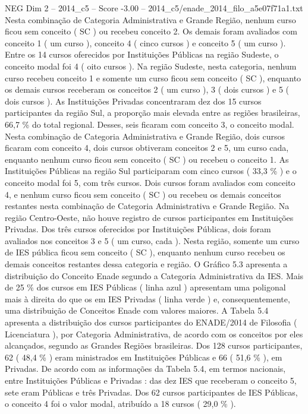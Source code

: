 \begin{textsample}{NEG Dim 2 – 2014\_c5 – Score -3.00 – 2014\_c5/enade\_2014\_filo\_a5e07f71a1.txt}
Nesta combinação de Categoria Administrativa e Grande Região, nenhum curso ficou sem conceito ( SC ) ou recebeu conceito 2.
Os demais foram avaliados com conceito 1 ( um curso ), conceito 4 ( cinco cursos ) e conceito 5 ( um curso ).
Entre os 14 cursos oferecidos por Instituições Públicas na região Sudeste, o conceito modal foi 4 ( oito cursos ).
Na região Sudeste, nesta categoria, nenhum curso recebeu conceito 1 e somente um curso ficou sem conceito ( SC ), enquanto os demais cursos receberam os conceitos 2 ( um curso ), 3 ( dois cursos ) e 5 ( dois cursos ).
As Instituições Privadas concentraram dez dos 15 cursos participantes da região Sul, a proporção mais elevada entre as regiões brasileiras, 66,7 \% do total regional.
Desses, seis ficaram com conceito 3, o conceito modal.
Nesta combinação de Categoria Administrativa e Grande Região, dois cursos ficaram com conceito 4, dois cursos obtiveram conceitos 2 e 5, um curso cada, enquanto nenhum curso ficou sem conceito ( SC ) ou recebeu o conceito 1.
As Instituições Públicas na região Sul participaram com cinco cursos ( 33,3 \% ) e o conceito modal foi 5, com três cursos.
Dois cursos foram avaliados com conceito 4, e nenhum curso ficou sem conceito ( SC ) ou recebeu os demais conceitos restantes nesta combinação de Categoria Administrativa e Grande Região.
Na região Centro-Oeste, não houve registro de cursos participantes em Instituições Privadas.
Dos três cursos oferecidos por Instituições Públicas, dois foram avaliados nos conceitos 3 e 5 ( um curso, cada ).
Nesta região, somente um curso de IES pública ficou sem conceito ( SC ), enquanto nenhum curso recebeu os demais conceitos restantes dessa categoria e região.
O Gráfico 5.3 apresenta a distribuição do Conceito Enade segundo a Categoria Administrativa da IES.
Mais de 25 \% dos cursos em IES Públicas ( linha azul ) apresentam uma poligonal mais à direita do que os em IES Privadas ( linha verde ) e, consequentemente, uma distribuição de Conceitos Enade com valores maiores.
A Tabela 5.4 apresenta a distribuição dos cursos participantes do ENADE/2014 de Filosofia ( Licenciatura ), por Categoria Administrativa, de acordo com os conceitos por eles alcançados, segundo as Grandes Regiões brasileiras.
Dos 128 cursos participantes, 62 ( 48,4 \% ) eram ministrados em Instituições Públicas e 66 ( 51,6 \% ), em Privadas.
De acordo com as informações da Tabela 5.4, em termos nacionais, entre Instituições Públicas e Privadas : das dez IES que receberam o conceito 5, sete eram Públicas e três Privadas.
Dos 62 cursos participantes de IES Públicas, o conceito 4 foi o valor modal, atribuído a 18 cursos ( 29,0 \% ).

\end{textsample}
